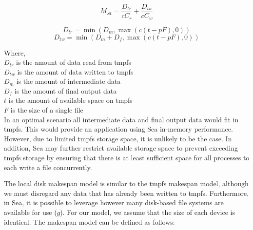 \documentclass[10pt,journal,compsoc]{IEEEtran}
\begin{document}
      \begin{equation}\label{eq:sea-comp:mst}
          M_{St} = \frac{D_{tr}}{cC_{r}} + \frac{D_{tw}}{cC_{w}}
      \end{equation}

      \begin{equation*}\label{eq:sea-comp:dtr}
          D_{tr} = \min\left(D_{m}, \max{\left(c(t - pF), 0 \right)} \right)
      \end{equation*}
      \begin{equation*}\label{eq:sea-comp:dtw}
          D_{tw} = \min\left(D_{m} + D_{f}, \max{\left(c(t - pF), 0 \right)} \right)
      \end{equation*}

      Where,\\
      $D_{tr}$ is the amount of data read from tmpfs \\
      $D_{tw}$ is the amount of data written to tmpfs \\
      $D_{m}$ is the amount of intermediate data \\
      $D_{f}$ is the amount of final output data \\
      $t$ is the amount of available space on tmpfs \\
      $F$ is the size of a single file \\

      In an optimal scenario all intermediate data and final output data would
      fit in tmpfs. This would provide an application using Sea in-memory
      performance. However, due to limited tmpfs storage space, it is unlikely
      to be the case. In addition, Sea may further restrict available storage
      space to prevent exceeding tmpfs storage by ensuring that there is at
      least sufficient space for all processes to each write a file
      concurrently.

      The local disk  makespan model is similar to the tmpfs makespan model,
      although we must disregard any data that has already been
      written to tmpfs. Furthermore, in Sea, it is possible to leverage however
      many disk-based file systems are available for use ($g$). For our model,
      we assume that the size of each device is identical. The makespan model
      can be defined as follows:
\end{document}
